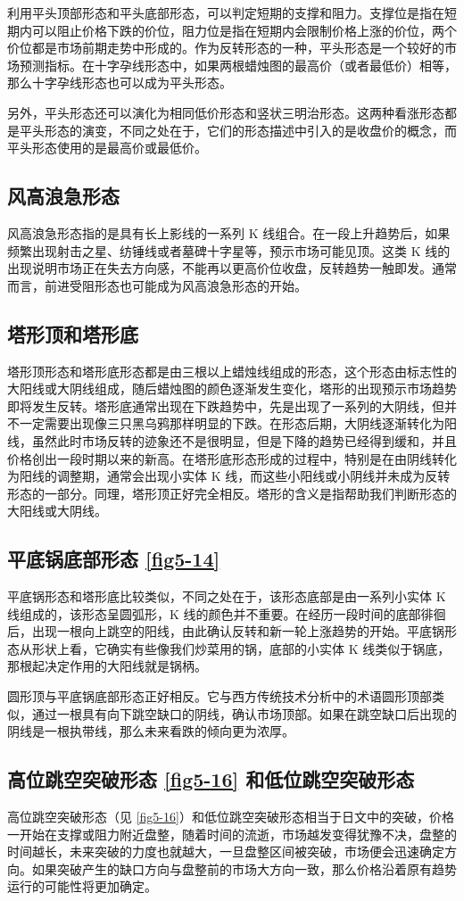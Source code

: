 利用平头顶部形态和平头底部形态，可以判定短期的支撑和阻力。支撑位是指在短期内可以阻止价格下跌的价位，阻力位是指在短期内会限制价格上涨的价位，两个价位都是市场前期走势中形成的。作为反转形态的一种，平头形态是一个较好的市场预测指标。在十字孕线形态中，如果两根蜡烛图的最高价（或者最低价）相等，那么十字孕线形态也可以成为平头形态。

另外，平头形态还可以演化为相同低价形态和竖状三明治形态。这两种看涨形态都是平头形态的演变，不同之处在于，它们的形态描述中引入的是收盘价的概念，而平头形态使用的是最高价或最低价。
\subsection{风高浪急形态}
风高浪急形态指的是具有长上影线的一系列 K 线组合。在一段上升趋势后，如果频繁出现射击之星、纺锤线或者墓碑十字星等，预示市场可能见顶。这类 K 线的出现说明市场正在失去方向感，不能再以更高价位收盘，反转趋势一触即发。通常而言，前进受阻形态也可能成为风高浪急形态的开始。
\subsection{塔形顶和塔形底}
塔形顶形态和塔形底形态都是由三根以上蜡烛线组成的形态，这个形态由标志性的大阳线或大阴线组成，随后蜡烛图的颜色逐渐发生变化，塔形的出现预示市场趋势即将发生反转。塔形底通常出现在下跌趋势中，先是出现了一系列的大阴线，但并不一定需要出现像三只黑乌鸦那样明显的下跌。在形态后期，大阴线逐渐转化为阳线，虽然此时市场反转的迹象还不是很明显，但是下降的趋势已经得到缓和，并且价格创出一段时期以来的新高。在塔形底形态形成的过程中，特别是在由阴线转化为阳线的调整期，通常会出现小实体 K 线，而这些小阳线或小阴线并未成为反转形态的一部分。同理，塔形顶正好完全相反。塔形的含义是指帮助我们判断形态的大阳线或大阴线。
\subsection{平底锅底部形态 \autoref{fig5-14}}
平底锅形态和塔形底比较类似，不同之处在于，该形态底部是由一系列小实体 K 线组成的，该形态呈圆弧形，K 线的颜色并不重要。在经历一段时间的底部徘徊后，出现一根向上跳空的阳线，由此确认反转和新一轮上涨趋势的开始。平底锅形态从形状上看，它确实有些像我们炒菜用的锅，底部的小实体 K 线类似于锅底，那根起决定作用的大阳线就是锅柄。


圆形顶与平底锅底部形态正好相反。它与西方传统技术分析中的术语圆形顶部类似，通过一根具有向下跳空缺口的阴线，确认市场顶部。如果在跳空缺口后出现的阴线是一根执带线，那么未来看跌的倾向更为浓厚。
\subsection{高位跳空突破形态 \autoref{fig5-16} 和低位跳空突破形态}
高位跳空突破形态（见 \autoref{fig5-16}）和低位跳空突破形态相当于日文中的突破，价格一开始在支撑或阻力附近盘整，随着时间的流逝，市场越发变得犹豫不决，盘整的时间越长，未来突破的力度也就越大，一旦盘整区间被突破，市场便会迅速确定方向。如果突破产生的缺口方向与盘整前的市场大方向一致，那么价格沿着原有趋势运行的可能性将更加确定。
